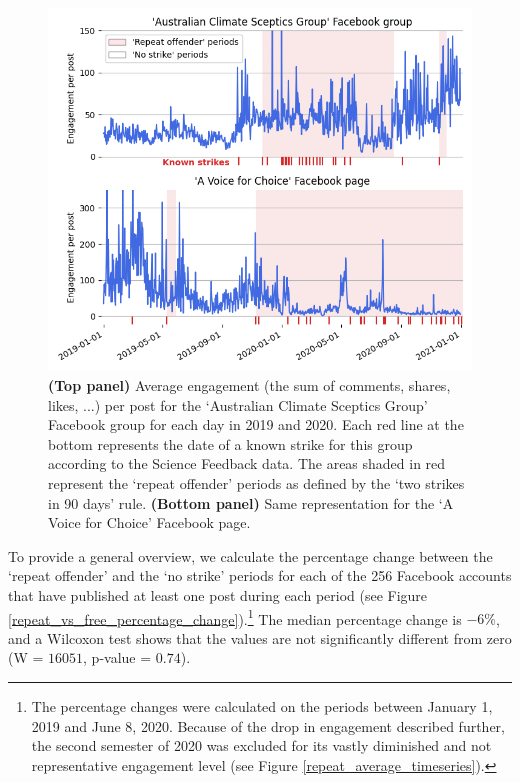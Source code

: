\documentclass[review]{elsarticle}
\begin{document}
\begin{figure}[!h]
\centering
\includegraphics[scale=0.5]{./../figure/sf_examples_timeseries.png}
\caption{
\textbf{(Top panel)} Average engagement (the sum of comments, shares, likes, ...) per post for the `Australian Climate Sceptics Group' Facebook group for each day in 2019 and 2020.
Each red line at the bottom represents the date of a known strike for this group according to the Science Feedback data. 
The areas shaded in red represent the `repeat offender' periods as defined by the ‘two strikes in 90 days’ rule.
\textbf{(Bottom panel)} Same representation for the `A Voice for Choice' Facebook page.
}
\label{repeat_example_timeseries}
\end{figure}

To provide a general overview, we calculate the percentage change between the `repeat offender' and the `no strike' periods for each of the 256 Facebook accounts that have published at least one post during each period (see Figure \ref{repeat_vs_free_percentage_change}).\footnote{The percentage changes were calculated on the periods between January 1, 2019 and June 8, 2020. Because of the drop in engagement described further, the second semester of 2020 was excluded for its vastly diminished and not representative engagement level (see Figure \ref{repeat_average_timeseries}).}
The median percentage change is $-6\%$, and a Wilcoxon test shows that the values are not significantly different from zero (W = $16051$, p-value = $0.74$).
\end{document}
